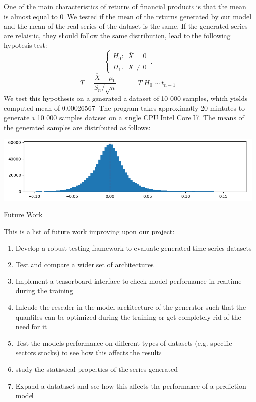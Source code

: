 \documentclass{article}
\begin{document}
    One of the main characteristics of returns of financial products is that the mean is almost equal to 0. We tested if the mean of the returns generated by our model and the mean 
    of the real series of the dataset is the same. If the generated series are relaistic, they should follow the same distribution, lead to the following hypotesis test:
    \begin{equation}
        \begin{cases}
        H_0: \;\; \overline{X}=0\\
        H_1: \;\; \overline{X} \neq 0
    \end{cases}\,.
    \end{equation}
    $$T=\frac{\overline{X}-\mu_0}{S_n/\sqrt{n}} \;\;\;\;\;\;\;\;\;\;\; T|H_0 \sim t_{n-1}$$
    We test this hypothesis on a generated a dataset of 10 000 samples, which yields computed mean of 0.00026567.
    The program takes approximatly 20 mintutes to generate a 10 000 samples dataset on a single CPU Intel Core I7. The means of the generated samples are distributed as follows:
    \begin{center}
        \includegraphics[scale=0.7]{imgs/generated.png}
    \end{center}
    
    \newpage
    \begin{center}
        {\huge{Future Work}}
    \end{center} 
    This is a list of future work improving upon our project:
    \begin{enumerate}
        \item Develop a robust testing framework to evaluate generated time series datasets
        \item Test and compare a wider set of architectures
        \item Implement a tensorboard interface to check model performance in realtime during the training
        \item Inlcude the rescaler in the model architecture of the generator such that the quantiles can be optimized during the training or get completely rid of the need for it
        \item Test the models performance on different types of datasets (e.g. specific sectors stocks) to see how this affects the results
        \item study the statistical properties of the series generated
        \item Expand a datataset and see how this affects the performance of a prediction model
    \end{enumerate}
\end{document}
